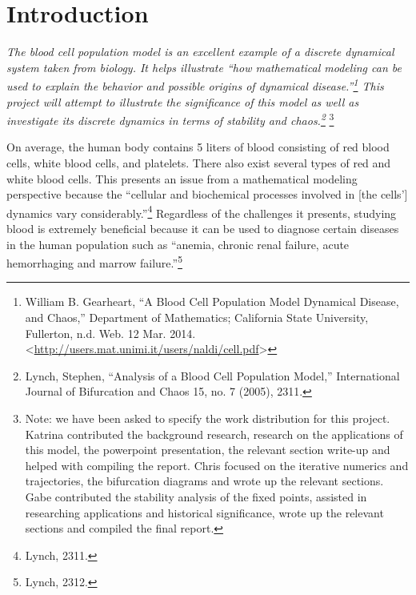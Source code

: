 \section*{Introduction}
	
	\emph{The blood cell population model is an excellent example of a discrete dynamical system taken from biology. It helps illustrate ``how mathematical modeling can be used to explain the behavior and possible origins of dynamical disease.''\footnote{William B. Gearheart, ``A Blood Cell Population Model Dynamical Disease, and Chaos,'' Department of Mathematics; California State University, Fullerton, n.d. Web. 12 Mar. 2014. <\url{http://users.mat.unimi.it/users/naldi/cell.pdf}>} This project will attempt to illustrate the significance of this model as well as investigate its discrete dynamics in terms of stability and chaos.\footnote{Lynch, Stephen, ``Analysis of a Blood Cell Population Model,'' International Journal of Bifurcation and Chaos 15, no. 7 (2005), 2311.}} \footnote{Note: we have been asked to specify the work distribution for this project. Katrina contributed the background research, research on the applications of this model, the powerpoint presentation, the relevant section write-up and helped with compiling the report. Chris focused on the iterative numerics and trajectories, the bifurcation diagrams and wrote up the relevant sections. Gabe contributed the stability analysis of the fixed points, assisted in researching applications and historical significance, wrote up the relevant sections and compiled the final report.}

	On average, the human body contains 5 liters of blood consisting of red blood cells, white blood cells, and platelets. There also exist several types of red and white blood cells. This presents an issue from a mathematical modeling perspective because the ``cellular and biochemical processes involved in [the cells’] dynamics vary considerably.''\footnote{Lynch, 2311.} Regardless of the challenges it presents, studying blood is extremely beneficial because it can be used to diagnose certain diseases in the human population such as ``anemia, chronic renal failure, acute hemorrhaging and marrow failure.''\footnote{Lynch, 2312.}
	
